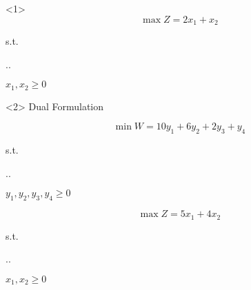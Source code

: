 \begin{frameExample}{}{}
  \begin{onlyenv}<1>
      \[ \max Z = 2x_1 + x_2 \]
      {\centering
      s.t.%
\vspace{4mm}
      
        \sysdelim..%

      \vspace{5mm}
      $x_1, x_2 \geq 0$
      \par}
  \end{onlyenv}

  \begin{onlyenv}<2>
    Dual Formulation
    
      \[ \min W = 10y_1 + 6y_2 + 2y_3 + y_4\]
      {\centering
      s.t.%
\vspace{4mm}
      
        \sysdelim..%

      \vspace{5mm}
      $y_1, y_2, y_3, y_4 \geq 0$
      \par}
  \end{onlyenv}
\end{frameExample}


\begin{frameExample}{}{}
  \[ \max Z = 5x_1 + 4x_2 \]
      {\centering
      s.t.%
\vspace{4mm}
      
        \sysdelim..%

      \vspace{5mm}
      $x_1, x_2 \geq 0$
      \par}
\end{frameExample}
  
